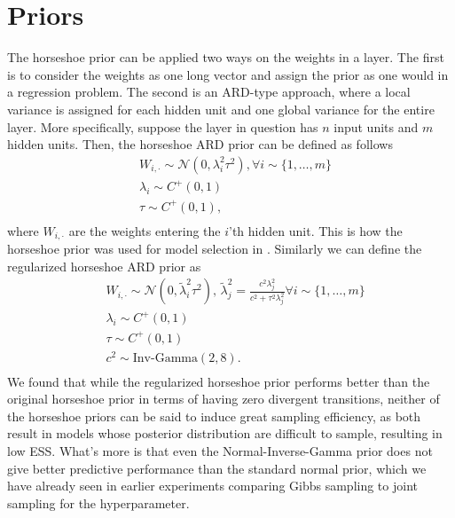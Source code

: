 \documentclass[12pt]{report}
\begin{document}
\section{Priors}

The horseshoe prior can be applied two ways on the weights in a layer. The first is to consider the weights as one long vector and assign the prior as one would in a regression problem. The second is an ARD-type approach, where a local variance is assigned for each hidden unit and one global variance for the entire layer. More specifically, suppose the layer in question has $n$ input units and $m$ hidden units. Then, the horseshoe ARD prior can be defined as follows 
\begin{align*}
& W_{i,\cdot} \sim \mathcal{N}(0,\lambda_i^2\tau^2) , \forall i \sim \{1,\dots, m \} \\
& \lambda_i \sim C^+(0,1) \\
& \tau \sim C^+(0,1), \\
\end{align*}
where $ W_{i,\cdot}  $ are the weights entering the $i$'th hidden unit. This is how the horseshoe prior was used for model selection in \cite{ghosh2017model}. Similarly we can define the regularized horseshoe ARD prior as 
\begin{align*}
& W_{i,\cdot} \sim \mathcal{N}(0,\tilde{\lambda}_i^2\tau^2) , \, \tilde{\lambda}_j^2 = \frac{c^2 \lambda_j^2}{c^2 + \tau^2 \lambda_j^2}  \forall i \sim \{1,\dots, m \} \\
& \lambda_i \sim C^+(0,1) \\
& \tau \sim C^+(0,1) \\
&c^2 \sim \text{Inv-Gamma}(2,8).\\
\end{align*}
We found that while the regularized horseshoe prior performs better than the original horseshoe prior in terms of having zero divergent transitions, neither of the horseshoe priors can be said to induce great sampling efficiency, as both result in models whose posterior distribution are difficult to sample, resulting in low ESS. What's more is that even the Normal-Inverse-Gamma prior does not give better predictive performance than the standard normal prior, which we have already seen in earlier experiments comparing Gibbs sampling to joint sampling for the hyperparameter. 
\end{document}
